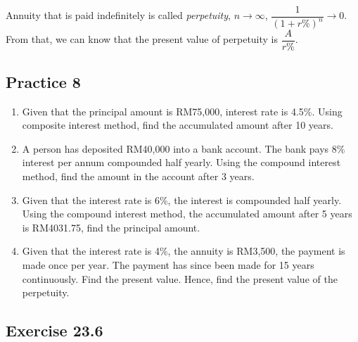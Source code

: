 \documentclass[12pt]{report}
\begin{document}
Annuity that is paid indefinitely is called \textit{perpetuity}, $n \to
  \infty$, $\dfrac{1}{(1+r\%)^n} \to 0$. From that, we can know that the present
value of perpetuity is $\dfrac{A}{r\%}$.

\subsection*{Practice 8}

\setlength{\columnseprule}{1pt}
\setlength{\columnsep}{24pt}
\begin{multicols}{2}
  \begin{enumerate}
    \item Given that the principal amount is RM75,000, interest rate is 4.5\%. Using
          composite interest method, find the accumulated amount after 10 years.
    \item A person has deposited RM40,000 into a bank account. The bank pays 8\% interest
          per annum compounded half yearly. Using the compound interest method, find the
          amount in the account after 3 years.
    \item Given that the interest rate is 6\%, the interest is compounded half yearly.
          Using the compound interest method, the accumulated amount after 5 years is
          RM4031.75, find the principal amount.
    \item Given that the interest rate is 4\%, the annuity is RM3,500, the payment is
          made once per year. The payment has since been made for 15 years continuously.
          Find the present value. Hence, find the present value of the perpetuity.
  \end{enumerate}
\end{multicols}

\subsection*{Exercise 23.6}
\end{document}
